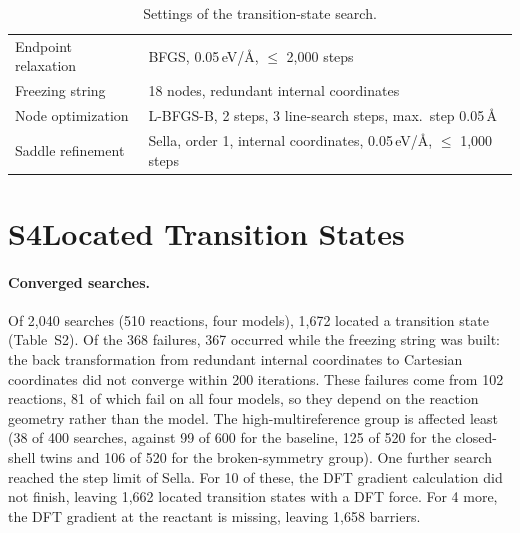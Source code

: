 \begin{table}[h]
  \caption{Settings of the transition-state search.}
  \begin{tabular}{ll}
    \hline
    Endpoint relaxation & BFGS, 0.05\,eV/\AA, $\leq$ 2,000 steps \\
    Freezing string     & 18 nodes, redundant internal coordinates \\
    Node optimization   & L-BFGS-B, 2 steps, 3 line-search steps, max.\ step 0.05\,\AA \\
    Saddle refinement   & Sella, order 1, internal coordinates, 0.05\,eV/\AA, $\leq$ 1,000 steps \\
    \hline
  \end{tabular}
\end{table}

\section{S4\quad Located Transition States}

\paragraph{Converged searches.} Of 2,040 searches (510 reactions, four models), 1,672 located a transition state (Table~S2). Of the 368 failures, 367 occurred while the freezing string was built: the back transformation from redundant internal coordinates to Cartesian coordinates did not converge within 200 iterations. These failures come from 102 reactions, 81 of which fail on all four models, so they depend on the reaction geometry rather than the model. The high-multireference group is affected least (38 of 400 searches, against 99 of 600 for the baseline, 125 of 520 for the closed-shell twins and 106 of 520 for the broken-symmetry group). One further search reached the step limit of Sella. For 10 of these, the DFT gradient calculation did not finish, leaving 1,662 located transition states with a DFT force. For 4 more, the DFT gradient at the reactant is missing, leaving 1,658 barriers.

